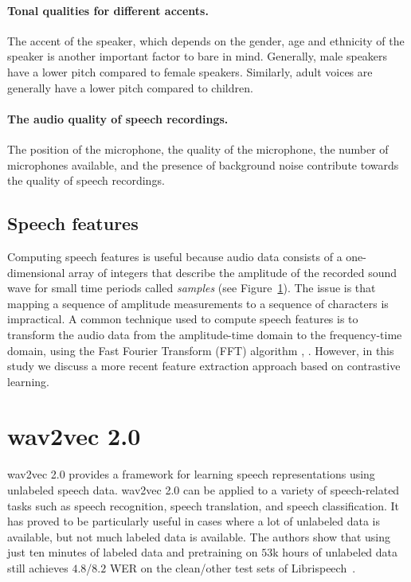 \paragraph*{Tonal qualities for different accents.} The accent of the speaker, which depends on the gender, 
age and ethnicity of the speaker is another important factor to bare in mind. Generally, male speakers
have a lower pitch compared to female speakers. Similarly, adult voices are generally have a lower pitch
compared to children.
\paragraph*{The audio quality of speech recordings.} The position of the microphone, the quality of the microphone, 
the number of microphones available, and the presence of background noise contribute towards the quality of speech recordings.



\subsection{Speech features}
Computing speech features is useful because audio data consists of a one-dimensional array of integers that describe the
amplitude of the recorded sound wave for small time periods called \emph{samples} (see Figure~\ref{}). 
The issue is that mapping a sequence of amplitude measurements to a sequence of characters is impractical. 
A common technique used to compute speech features is to transform the audio data from the amplitude-time domain 
to the frequency-time domain, using the Fast Fourier Transform (FFT) algorithm \cite{cochran1967fast}, \cite{cooley1969fast}.
However, in this study we discuss a more recent feature extraction approach based on contrastive learning.



\section{wav2vec 2.0}
wav2vec 2.0 provides a framework for learning speech representations using unlabeled speech data.
wav2vec 2.0 can be applied to a variety of speech-related tasks such as speech recognition, speech translation,
and speech classification.
It has proved to be particularly useful in cases where a lot of unlabeled data is available, but not much labeled data is available.
The authors show that using just ten minutes of labeled data and pretraining
on $53$k hours of unlabeled data still achieves $4.8$/$8.2$ WER on the clean/other test sets of Librispeech~\cite{}.

